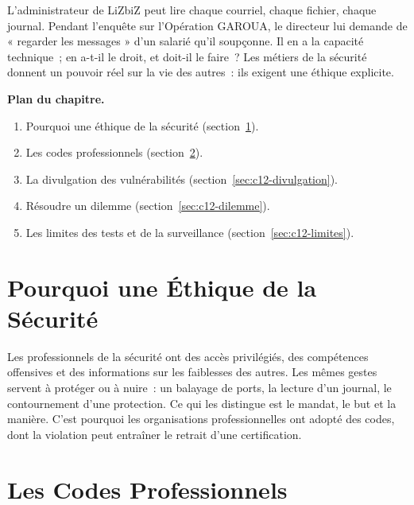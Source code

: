 L'administrateur de LiZbiZ peut lire chaque courriel, chaque fichier,
chaque journal. Pendant l'enquête sur l'Opération GAROUA, le directeur
lui demande de « regarder les messages » d'un salarié qu'il soupçonne. Il
en a la capacité technique~; en a-t-il le droit, et doit-il le faire~?
Les métiers de la sécurité donnent un pouvoir réel sur la vie des autres~:
ils exigent une éthique explicite.

\medskip
\textbf{Plan du chapitre.}
\begin{enumerate}
    \item Pourquoi une éthique de la sécurité (section~\ref{sec:c12-pourquoi}).
    \item Les codes professionnels (section~\ref{sec:c12-codes}).
    \item La divulgation des vulnérabilités (section~\ref{sec:c12-divulgation}).
    \item Résoudre un dilemme (section~\ref{sec:c12-dilemme}).
    \item Les limites des tests et de la surveillance (section~\ref{sec:c12-limites}).
\end{enumerate}

\separateur

\section{Pourquoi une Éthique de la Sécurité}
\label{sec:c12-pourquoi}

Les professionnels de la sécurité ont des accès privilégiés, des
compétences offensives et des informations sur les faiblesses des
autres. Les mêmes gestes servent à protéger ou à nuire~: un balayage de
ports, la lecture d'un journal, le contournement d'une protection. Ce qui
les distingue est le mandat, le but et la manière. C'est pourquoi les
organisations professionnelles ont adopté des codes, dont la violation peut
entraîner le retrait d'une certification.

\section{Les Codes Professionnels}
\label{sec:c12-codes}


